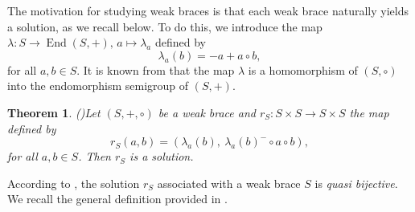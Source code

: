 \documentclass[preprint,1p]{elsarticle}
\newtheorem{theor}{Theorem}[section]
\theoremstyle{definition}               %
\newtheorem{ex}[theor]{Example}
\DeclareMathOperator{\End}{End}
\begin{document}



\medskip

The motivation for studying weak braces is that each weak brace naturally yields a solution, as we recall below. To do this, we introduce the map $\lambda: S\to \End(S,+), \,a\mapsto\lambda_a$ defined by $$\lambda_a\left(b\right) = -a+a\circ b,$$
for all $a, b\in S$. It is known from \cite[Proposition 7]{CaMaMiSt22} that the map $\lambda$ is a homomorphism of $\left(S,\circ\right)$ into the endomorphism semigroup of $\left(S,+\right)$. %



\begin{theor}\emph{(\cite[Theorem 11]{CaMaMiSt22})}\label{teo_solu_weak}
    Let $(S, +, \circ)$ be a weak brace and $r_S:S\times S\to S\times S$ the map defined by $$r_S\left(a,b\right)
    = \left(\lambda_a(b), \ \lambda_a(b)^- \circ a \circ b\right),$$ 
for all $a,b\in S$. Then $r_S$ is a solution.
\end{theor}

According to \cite[Theorem 13]{CaMaMiSt22}, the solution $r_S$ associated with a weak brace $S$ is \emph{quasi bijective}. We recall the general definition provided in \cite[Definition 3.1]{MaSteWi26x}.
\end{document}
